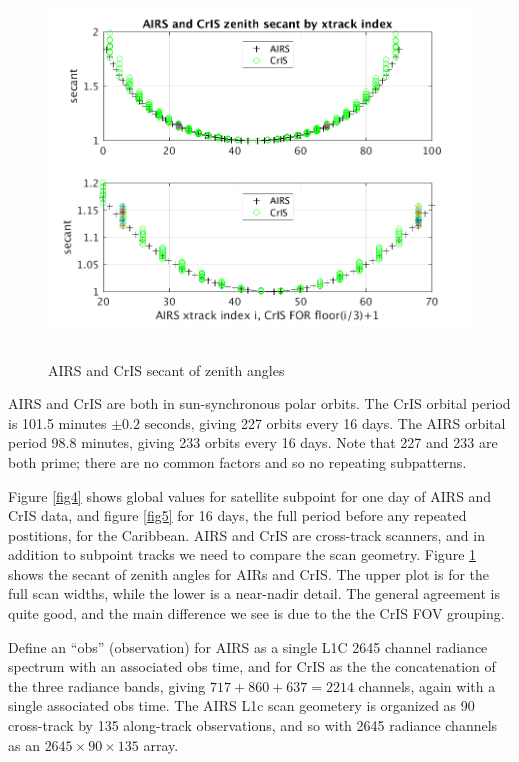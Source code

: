 \documentclass[12pt]{article}
\begin{document}
\begin{figure} %
  \centering
  \includegraphics[height=10cm]{figures/AIRS_CrIS_secant_by_xtrack.png}
  \caption{AIRS and CrIS secant of zenith angles}
  \label{fig6}
\end{figure}

AIRS and CrIS are both in sun-synchronous polar orbits.  The CrIS
orbital period is 101.5 minutes $\pm 0.2$ seconds, giving 227 orbits
every 16 days.  The AIRS orbital period 98.8 minutes, giving 233
orbits every 16 days.  Note that 227 and 233 are both prime; there
are no common factors and so no repeating subpatterns.

Figure \ref{fig4} shows global values for satellite subpoint for
one day of AIRS and CrIS data, and figure \ref{fig5} for 16 days,
the full period before any repeated postitions, for the Caribbean.
AIRS and CrIS are cross-track scanners, and in addition to subpoint
tracks we need to compare the scan geometry.  Figure \ref{fig6}
shows the secant of zenith angles for AIRs and CrIS.  The upper plot
is for the full scan widths, while the lower is a near-nadir detail.
The general agreement is quite good, and the main difference we see
is due to the the CrIS FOV grouping.

Define an ``obs'' (observation) for AIRS as a single L1C 2645
channel radiance spectrum with an associated obs time, and for CrIS
as the the concatenation of the three radiance bands, giving $717 +
860 + 637 = 2214$ channels, again with a single associated obs time.
The AIRS L1c scan geometery is organized as 90 cross-track by 135
along-track observations, and so with 2645 radiance channels as an
$2645 \times 90 \times 135$ array.
\end{document}
